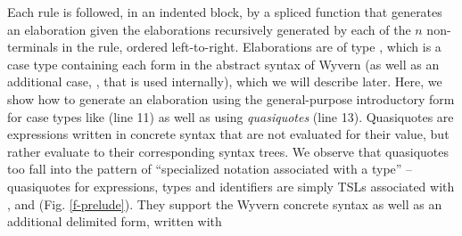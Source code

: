 Each rule is followed, in an indented block, by a spliced function that generates an elaboration given the elaborations recursively generated by each of the $n$ non-terminals in the rule, ordered left-to-right. Elaborations are of type , which is a case type containing each form in the abstract syntax of Wyvern (as well as an additional case, , that is used internally), which we will describe later. Here, we show how to generate an elaboration using the general-purpose introductory form for case types like  (line 11) as well as using \emph{quasiquotes} (line 13). Quasiquotes are expressions written in concrete syntax that are not evaluated for their value, but rather evaluate to their corresponding syntax trees. We observe that quasiquotes too fall into the pattern of ``specialized notation associated with a type'' -- quasiquotes for expressions, types and identifiers are simply TSLs associated with ,  and  (Fig. \ref{f-prelude}). They support the Wyvern concrete syntax as well as an additional delimited form, written with \li{%

We have now seen several examples of TSLs that support splicing. The question then arises: what type should the spliced Wyvern expression be expected to have? This is determined by the elaboration itself, by placing the spliced value in a place in the generated AST where its type is known -- on line 11 of Fig. \ref{f-htmltype} it is known to be \li{HTML} and on line 13 it is known to be \li{CSS} by the declaration of \li{HTML}, and on line 15, it is known to be \li{HTML} by the use of an explicit ascription. When these generated ASTs are recursively typechecked during compilation, any use of a nested TSL at the top-level (e.g. the CSS TSL in Fig \ref{f-example}) will operate as intended. 

}
